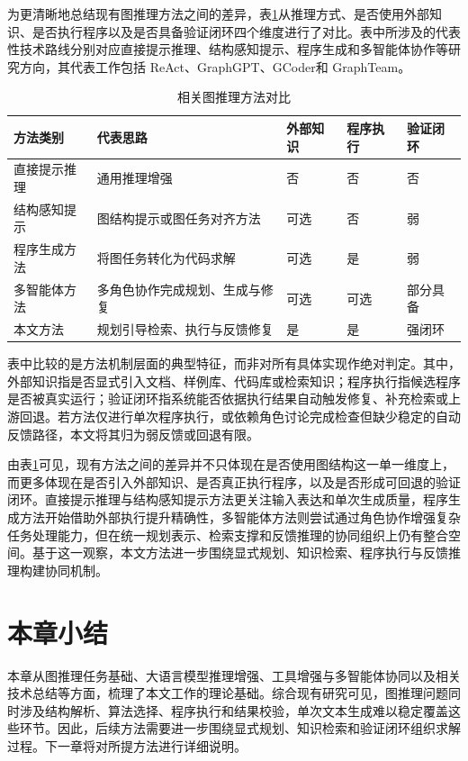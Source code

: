 为更清晰地总结现有图推理方法之间的差异，表\ref{tab:related_compare}从推理方式、是否使用外部知识、是否执行程序以及是否具备验证闭环四个维度进行了对比。表中所涉及的代表性技术路线分别对应直接提示推理、结构感知提示、程序生成和多智能体协作等研究方向，其代表工作包括 ReAct\cite{yao2023react}、GraphGPT\cite{tang2024graphgpt}、GCoder\cite{zhang2025gcoder}和 GraphTeam\cite{li2024graphteam}。

\begin{table}[htbp]
\centering
\small
\caption{相关图推理方法对比}
\label{tab:related_compare}
\renewcommand{\arraystretch}{1.15}
\begin{tabularx}{\textwidth}{
>{\raggedright\arraybackslash}p{2.4cm}
>{\raggedright\arraybackslash}X
>{\centering\arraybackslash}p{1.8cm}
>{\centering\arraybackslash}p{1.8cm}
>{\centering\arraybackslash}p{2.1cm}}
\toprule
方法类别 & 代表思路 & 外部知识 & 程序执行 & 验证闭环 \\
\midrule
直接提示推理 & 通用推理增强 & 否 & 否 & 否 \\
结构感知提示 & 图结构提示或图任务对齐方法 & 可选 & 否 & 弱 \\
程序生成方法 & 将图任务转化为代码求解 & 可选 & 是 & 弱 \\
多智能体方法 & 多角色协作完成规划、生成与修复 & 可选 & 可选 & 部分具备 \\
本文方法 & 规划引导检索、执行与反馈修复 & 是 & 是 & 强闭环 \\
\bottomrule
\end{tabularx}
\end{table}

表中比较的是方法机制层面的典型特征，而非对所有具体实现作绝对判定。其中，外部知识指是否显式引入文档、样例库、代码库或检索知识；程序执行指候选程序是否被真实运行；验证闭环指系统能否依据执行结果自动触发修复、补充检索或上游回退。若方法仅进行单次程序执行，或依赖角色讨论完成检查但缺少稳定的自动反馈路径，本文将其归为弱反馈或回退有限。

由表\ref{tab:related_compare}可见，现有方法之间的差异并不只体现在是否使用图结构这一单一维度上，而更多体现在是否引入外部知识、是否真正执行程序，以及是否形成可回退的验证闭环。直接提示推理与结构感知提示方法更关注输入表达和单次生成质量，程序生成方法开始借助外部执行提升精确性，多智能体方法则尝试通过角色协作增强复杂任务处理能力，但在统一规划表示、检索支撑和反馈推理的协同组织上仍有整合空间。基于这一观察，本文方法进一步围绕显式规划、知识检索、程序执行与反馈推理构建协同机制。

\section{本章小结}

本章从图推理任务基础、大语言模型推理增强、工具增强与多智能体协同以及相关技术总结等方面，梳理了本文工作的理论基础。综合现有研究可见，图推理问题同时涉及结构解析、算法选择、程序执行和结果校验，单次文本生成难以稳定覆盖这些环节。因此，后续方法需要进一步围绕显式规划、知识检索和验证闭环组织求解过程。下一章将对所提方法进行详细说明。
